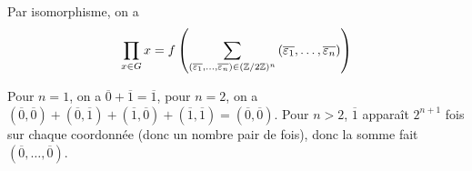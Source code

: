 \documentclass[12pt]{article}
\begin{document}
\begin{remark}
	Par isomorphisme, on a 
	\begin{equation}
		\prod_{x\in G}x=f\left(\sum_{(\overline{\varepsilon_{1}},\dots,\overline{\varepsilon_{n}})\in(\mathbb{Z}/2\mathbb{Z})^{n}}\left(\overline{\varepsilon_{1}},\dots,\overline{\varepsilon_{n}}\right)\right)
	\end{equation}

	Pour $n=1$, on a $\overline{0}+\overline{1}=\overline{1}$, pour $n=2$, on a $(\overline{0},\overline{0})+(\overline{0},\overline{1})+(\overline{1},\overline{0})+(\overline{1},\overline{1})=(\overline{0},\overline{0})$. Pour $n>2$, $\overline{1}$ apparaît $2^{n+1}$ fois sur chaque coordonnée (donc un nombre pair de fois), donc la somme fait $(\overline{0},\dots,\overline{0})$.
\end{remark}
\end{document}
